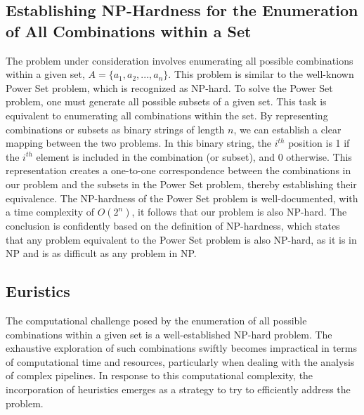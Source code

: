 \subsection{Establishing NP-Hardness for the Enumeration of All Combinations within a Set}
The problem under consideration involves enumerating all possible combinations within a given set,
$A = \{a_1, a_2, ..., a_n\}$.
This problem is similar to the well-known Power Set problem, which is recognized as NP-hard.
To solve the Power Set problem, one must generate all possible subsets of a given set.
This task is equivalent to enumerating all combinations within the set.
By representing combinations or subsets as binary strings of length $n$,
we can establish a clear mapping between the two problems.
In this binary string, the $i^{th}$ position is 1 if the $i^{th}$ element is included in the combination (or subset), and 0 otherwise.
This representation creates a one-to-one correspondence between the combinations in our problem and the subsets in the Power Set problem,
thereby establishing their equivalence. The NP-hardness of the Power Set problem is well-documented, with a time complexity of $O(2^n)$,
it follows that our problem is also NP-hard.
The conclusion is confidently based on the definition of NP-hardness,
which states that any problem equivalent to the Power Set problem is also NP-hard,
as it is in NP and is as difficult as any problem in NP.

\subsection{Euristics}
The computational challenge posed by the enumeration of all possible combinations within a given set is a well-established NP-hard problem.
The exhaustive exploration of such combinations swiftly becomes impractical in terms of computational time and resources,
particularly when dealing with the analysis of complex pipelines.
In response to this computational complexity,
the incorporation of heuristics emerges as a strategy to try to efficiently address the problem.

